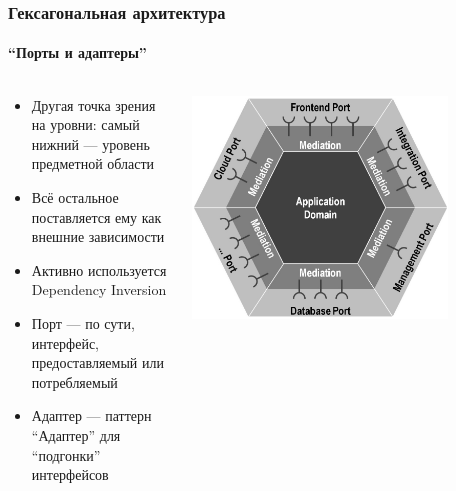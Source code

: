 \documentclass{../../slides-style}
\begin{document}
    \begin{frame}
        \frametitle{Гексагональная архитектура}
        \framesubtitle{``Порты и адаптеры''}
        \begin{columns}
            \begin{column}{0.5\textwidth}
                \begin{itemize}
                    \item Другая точка зрения на уровни: самый нижний --- уровень предметной области
                    \item Всё остальное поставляется ему как внешние зависимости
                    \item Активно используется Dependency Inversion
                    \item Порт --- по сути, интерфейс, предоставляемый или потребляемый
                    \item Адаптер --- паттерн ``Адаптер'' для ``подгонки'' интерфейсов
                \end{itemize}
            \end{column}
            \begin{column}{0.5\textwidth}
                \begin{center}
                    \includegraphics[width=0.8\textwidth]{hexagonalArchitecture.png}
                \end{center}
            \end{column}
        \end{columns}
    \end{frame}
\end{document}
